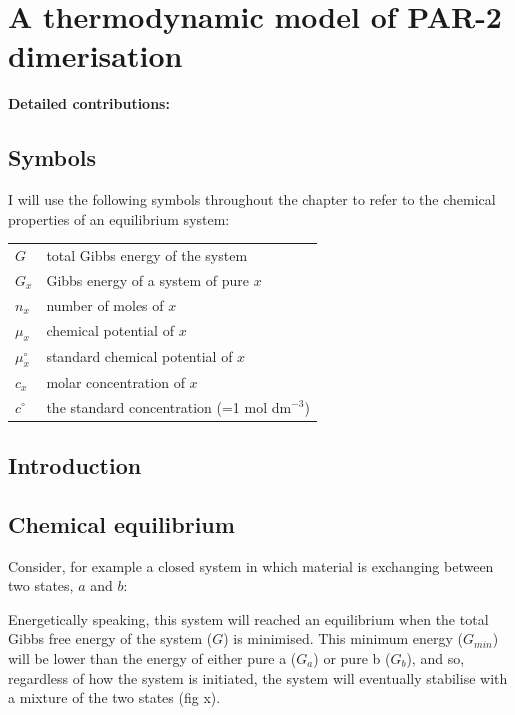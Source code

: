 \documentclass[12pt]{"report"}
\begin{document}
\clearpage
\chapter{A thermodynamic model of PAR-2 dimerisation}

\textbf{Detailed contributions:}\\

\clearpage
\section*{Symbols}

I will use the following symbols throughout the chapter to refer to the chemical properties of an equilibrium system:\\

\begin{tabular}{ll}
$G$ & total Gibbs energy of the system\\
$G_x$ & Gibbs energy of a system of pure $x$\\
$n_x$ & number of moles of $x$\\
$\mu_x$ & chemical potential of $x$\\
$\mu_x^{\circ}$ & standard chemical potential of $x$\\
$c_x$ & molar concentration of $x$\\
$c^{\circ}$ & the standard concentration (=1 mol dm$^{-3}$)\\
\end{tabular}


\clearpage
\section{Introduction}




\clearpage
\section{Chemical equilibrium}

Consider, for example a closed system in which material is exchanging between two states, $a$ and $b$:
\begin{center}
\end{center}

Energetically speaking, this system will reached an equilibrium when the total Gibbs free energy of the system ($G$) is minimised. This minimum energy ($G_{min}$) will be lower than the energy of either pure a ($G_a$) or pure b ($G_b$), and so, regardless of how the system is initiated, the system will eventually stabilise with a mixture of the two states (fig x).\\ 
\end{document}
